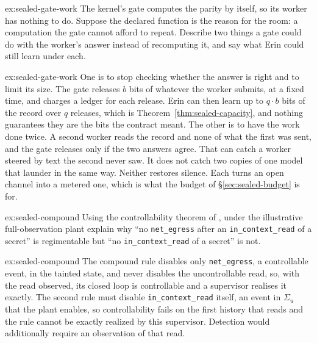 \documentclass[11pt,a4paper]{article}
\theoremstyle{definition}
\begin{document}
\begin{pdexercise}[kind=Open,rating=3]{ex:sealed-gate-work}
The kernel's gate computes the parity by itself, so its worker has nothing
to do. Suppose the declared function is the reason for the room: a
computation the gate cannot afford to repeat. Describe two things a gate
could do with the worker's answer instead of recomputing it, and say what
Erin could still learn under each.
\end{pdexercise}
\begin{pdsolution}{ex:sealed-gate-work}
One is to stop checking whether the answer is right and to limit its size.
The gate releases $b$ bits of whatever the worker submits, at a fixed
time, and charges a ledger for each release. Erin can then learn up to
$q\cdot b$ bits of the record over $q$ releases, which is
Theorem~\ref{thm:sealed-capacity}, and nothing guarantees they are the
bits the contract meant. The other is to have the work done twice. A
second worker reads the record and none of what the first was sent, and
the gate releases only if the two answers agree. That can catch a worker
steered by text the second never saw. It does not catch two copies of one
model that launder in the same way. Neither restores silence. Each turns
an open channel into a metered one, which is what the budget of
\S\ref{sec:sealed-budget} is for.
\end{pdsolution}


\begin{pdexercise}[kind=Check,rating=1]{ex:sealed-compound}
Using the controllability theorem of ,
under the illustrative full-observation plant explain why ``no \texttt{net\_egress} after an
\texttt{in\_context\_read} of a secret'' is regimentable but ``no
\texttt{in\_context\_read} of a secret'' is not.
\end{pdexercise}
\begin{pdsolution}{ex:sealed-compound}
The compound rule disables only \texttt{net\_egress}, a controllable event, in
the tainted state, and never disables the uncontrollable read, so, with the read observed, its closed
loop is controllable and a supervisor realises it exactly. The second rule
must disable \texttt{in\_context\_read} itself, an event in $\Sigma_u$ that the
plant enables, so controllability fails on the first history that reads and the
rule cannot be exactly realized by this supervisor. Detection would additionally require an observation of that read.
\end{pdsolution}
\end{document}

